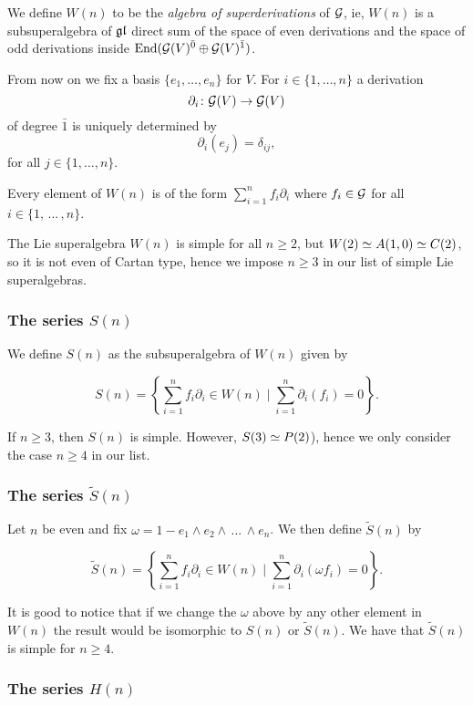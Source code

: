 We define $W(n)$ to be the \emph{algebra of superderivations} of $\mathcal G$, ie, $W(n)$ is a subsuperalgebra of $\mathfrak{gl} $ direct sum of the space of even derivations and the space of odd derivations inside $\operatorname{End}(\mathcal G(V)^{\bar0}\oplus\mathcal G(V)^{\bar1})$.

From now on we fix a basis $\{e_1,\ldots,e_n\}$ for $V$. For $i\in \{1,\ldots ,n\}$ a derivation \[\partial_i \colon \mathcal G(V) \rightarrow \mathcal G(V)\] of degree $\bar 1$ is uniquely determined by \[\partial_i (e_j) =  \delta_{ij},\] for all $j\in \{1,\ldots ,n\}.$

Every element of $W(n)$ is of the form $\sum_{i=1}^{n} f_i \partial_i$ where $f_i \in \mathcal G$ for all $i\in\{1,\, ...\, ,n\}$.

The Lie superalgebra $W(n)$ is simple for all $n\geq 2$, but $W(2)\simeq A(1,0)\simeq C(2)$, so it is not even of Cartan type, hence we impose $n\geq 3$ in our list of simple Lie superalgebras.

\subsubsection{The series $S(n)$}

We define $S(n)$ as the subsuperalgebra of $W(n)$ given by

\[
	S(n) = \left\{ \sum_{i=1}^{n} f_i \partial_i \in W(n) \mid
	\sum_{i=1}^{n} \partial_i (f_i) =0
	\right\}.
\]

If $n\geq 3$, then $S(n)$ is simple. However, $S(3)\simeq P(2)$), hence we only consider the case $n\geq 4$ in our list.

\subsubsection{The series $\tilde S(n)$}

Let $n$ be even and fix $\omega = 1 - e_1\wedge e_2\wedge \, ...\, \wedge e_n$. We then define $\tilde S(n)$ by

\[
	\tilde S(n) = \left\{ \sum_{i=1}^{n} f_i \partial_i \in W(n) \mid
	\sum_{i=1}^{n} \partial_i (\omega f_i) =0
	\right\}.
\]

It is good to notice that if we change the $\omega$ above by any other element in $W(n)$ the result would be isomorphic to $S(n)$ or $\tilde S(n)$.
We have that $\tilde S(n)$ is simple for $n\geq 4$.

\subsubsection{The series $H(n)$}

